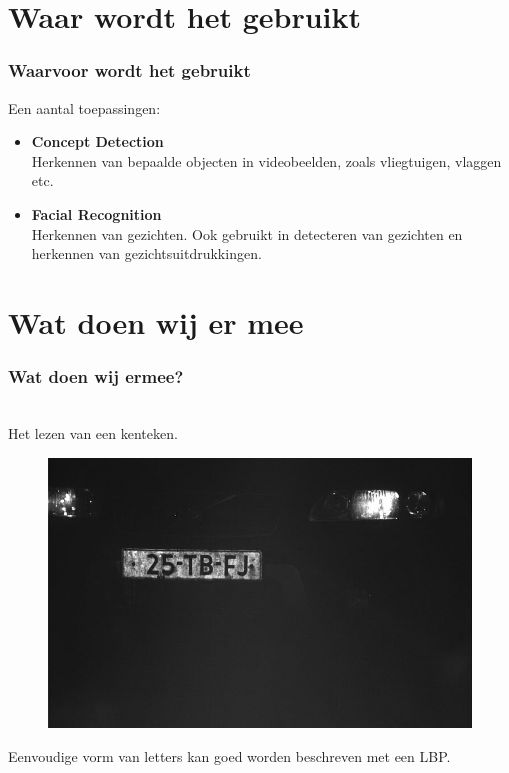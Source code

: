 \documentclass{beamer}
\begin{document}
	\section{Waar wordt het gebruikt}
  
  \begin{frame}
    \frametitle{Waarvoor wordt het gebruikt}
    Een aantal toepassingen:
    \begin{itemize}
      \item \textbf{Concept Detection}\\
        Herkennen van bepaalde objecten in videobeelden, zoals vliegtuigen, vlaggen etc.
      \item \textbf{Facial Recognition}\\
        Herkennen van gezichten. Ook gebruikt in detecteren van gezichten en herkennen van 
        gezichtsuitdrukkingen.
    \end{itemize}	
  \end{frame}	
	
	\section{Wat doen wij er mee}
  
  \begin{frame}
    \frametitle{Wat doen wij ermee?}
    \\
    Het lezen van een kenteken.
    \begin{figure}
      \includegraphics[scale=0.2]{00991_000000.jpg}
    \end{figure}
    Eenvoudige vorm van letters kan goed worden beschreven met een LBP.
  \end{frame}
		
\end{document}

